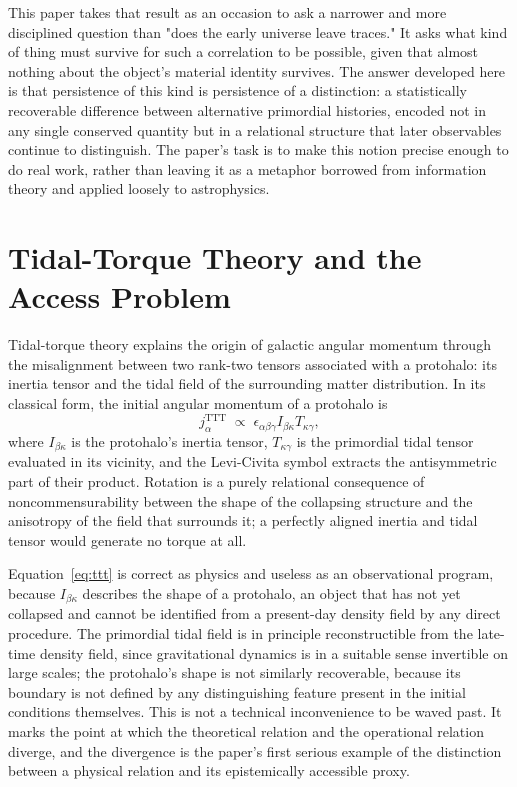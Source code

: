 \documentclass[11pt]{article}
\begin{document}
This paper takes that result as an occasion to ask a narrower and more disciplined question than "does the early universe leave traces." It asks what kind of thing must survive for such a correlation to be possible, given that almost nothing about the object's material identity survives. The answer developed here is that persistence of this kind is persistence of a distinction: a statistically recoverable difference between alternative primordial histories, encoded not in any single conserved quantity but in a relational structure that later observables continue to distinguish. The paper's task is to make this notion precise enough to do real work, rather than leaving it as a metaphor borrowed from information theory and applied loosely to astrophysics.

\section{Tidal-Torque Theory and the Access Problem}

Tidal-torque theory explains the origin of galactic angular momentum through the misalignment between two rank-two tensors associated with a protohalo: its inertia tensor and the tidal field of the surrounding matter distribution. In its classical form, the initial angular momentum of a protohalo is
\begin{equation}
j^{\mathrm{TTT}}_\alpha \;\propto\; \epsilon_{\alpha\beta\gamma} I_{\beta\kappa} T_{\kappa\gamma},
\label{eq:ttt}
\end{equation}
where $I_{\beta\kappa}$ is the protohalo's inertia tensor, $T_{\kappa\gamma}$ is the primordial tidal tensor evaluated in its vicinity, and the Levi-Civita symbol extracts the antisymmetric part of their product. Rotation is a purely relational consequence of noncommensurability between the shape of the collapsing structure and the anisotropy of the field that surrounds it; a perfectly aligned inertia and tidal tensor would generate no torque at all.

Equation~\eqref{eq:ttt} is correct as physics and useless as an observational program, because $I_{\beta\kappa}$ describes the shape of a protohalo, an object that has not yet collapsed and cannot be identified from a present-day density field by any direct procedure. The primordial tidal field is in principle reconstructible from the late-time density field, since gravitational dynamics is in a suitable sense invertible on large scales; the protohalo's shape is not similarly recoverable, because its boundary is not defined by any distinguishing feature present in the initial conditions themselves. This is not a technical inconvenience to be waved past. It marks the point at which the theoretical relation and the operational relation diverge, and the divergence is the paper's first serious example of the distinction between a physical relation and its epistemically accessible proxy.
\end{document}
